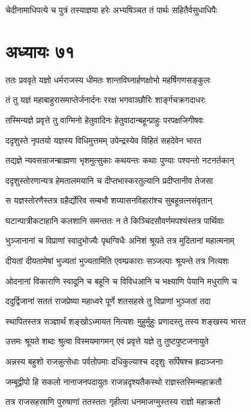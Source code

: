 \twolineshloka
{चेदीनामाधिपत्ये च पुत्रं तस्याज्ञया हरेः}
{अभ्यषिञ्चत तं पार्थः सहितैर्वसुधाधिपैः}


\chapter{अध्यायः ७१}
\twolineshloka
{ततः प्रववृते यज्ञो धर्मराजस्य धीमतः}
{शान्तविघ्नार्हणक्षोभो महर्षिगणसङ्कुलः}


\twolineshloka
{तं तु यज्ञं महाबाहुरासमाप्तेर्जनार्दनः}
{ररक्ष भगवाञ्छौरिः शार्ङ्गचक्रगदाधरः}


\twolineshloka
{तस्मिन्यज्ञे प्रवृत्ते तु वाग्मिनो हेतुवादिनः}
{हेतुवादान्बहून्प्राहुः परपक्षजिगीषवः}


\twolineshloka
{ददृशुस्ते नृपतयो यज्ञस्य विधिमुत्तमम्}
{उपेन्द्रस्येव विहितं सहदेवेन भारत}


\twolineshloka
{तद्यज्ञे न्यवसन्राजन्ब्राह्मणा भृशमुत्सुकाः}
{कथयन्तः कथाः पुण्याः पश्यन्तो नटनर्तकान्}


\twolineshloka
{ददृशुस्तोरणान्यत्र हेमतालमयानि च}
{दीप्तभास्करतुल्यानि प्रदीप्तानीव तेजसा}


\twolineshloka
{स यज्ञस्तोरणैस्तत्र ग्रहैर्द्योरिव सम्बभौ}
{शय्यासनविहारांश्च सुबहून्रत्नसंवृतान्}


\twolineshloka
{घटान्पात्रीकटाहानि कलशानि समन्ततः}
{न ते किञ्चिदसौवर्णमपश्यंस्तत्र पार्थिवाः}


\twolineshloka
{भुञ्जानानां च विप्राणां स्वादुभोज्यैः पृथग्विधैः}
{अनिशं श्रूयते तत्र मुदितानां महात्मनाम्}


\twolineshloka
{दीयतां दीयतामेषां भुज्यतां भुज्यतामिति}
{एवम्प्रकाराः सञ्जल्पाः श्रूयन्ते तत्र नित्यशः}


\twolineshloka
{ओदनानां विकाराणि स्वादूनि च बहूनि च}
{विविधआनि च भक्ष्याणि पेयानि मधुराणि च}


\twolineshloka
{ददुर्द्विजानां सततं राजप्रेष्या महाध्वरे}
{पूर्णे शतसहस्रे तु विप्राणां भुञ्जतां तदा}


\twolineshloka
{स्थापितस्तत्र सञ्ज्ञार्थं शङ्खोऽध्मायत नित्यशः}
{मुहुर्मुहुः प्रणादस्तु तस्य शङ्खस्य भारत}


\twolineshloka
{उत्तमः श्रूयते शब्दः श्रुत्वा विस्मयमागमन्}
{एवं प्रवृत्ते यज्ञे तु तुष्टपुष्टजनायुते}


\twolineshloka
{अन्नस्य बहुशो राजन्नुत्सेधाः पर्वतोपमाः}
{दधिकुल्याश्च ददृशुः सर्पिषश्च ह्रदाञ्जनाः}


\twolineshloka
{जम्बूद्वीपो हि सकलो नानाजनपदायुतः}
{राजन्नदृश्यतैकस्थो राज्ञस्तस्मिन्महाक्रतौ}


\twolineshloka
{तत्र राजसहस्राणि पुरुषाणां ततस्ततः}
{गृहीत्वा धनमाजग्मुस्तस्य राज्ञो महाक्रतौ}


